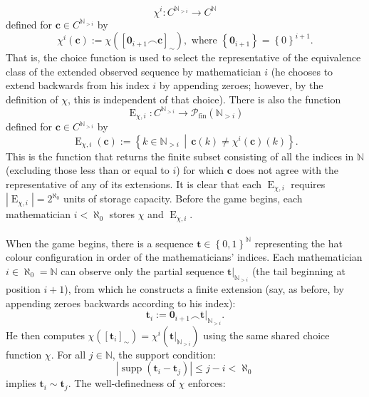 \documentclass[11pt, a4paper, oneside]{article}
\theoremstyle{remark}
\theoremstyle{lemma}
\begin{document}
\[
\chi^{i} \colon C^{\mathbb{N}_{>i}} \rightarrow C^{\mathbb{N}}
\]
defined for \( \mathbf{c} \in C^{\mathbb{N}_{>i}} \) by
\[
\chi^{i} \left( \mathbf{c} \right) := \chi \left( \left[ \mathbf{0}_{i+1} \frown \mathbf{c} \right]_{\sim} \right), \text{ where } \left\{\mathbf{0}_{i+1}\right\} = \left\{0\right\}^{i+1}.
\]
That is, the choice function is used to select the representative of the equivalence class of the extended observed sequence by mathematician \( i \) (he chooses to extend backwards from his index \( i \) by appending zeroes; however, by the definition of \( \chi \), this is independent of that choice). There is also the function
\[
\operatorname{E}_{\chi, i} \colon C^{\mathbb{N}_{>i}} \rightarrow \mathscr{P}_{\mathrm{fin}} \left( \mathbb{N}_{>i} \right)
\]
defined for \( \mathbf{c} \in C^{\mathbb{N}_{>i}} \) by
\[
\operatorname{E}_{\chi, i} \left( \mathbf{c} \right) := \left\{ k \in \mathbb{N}_{>i} \,\middle|\, \mathbf{c}(k) \neq \chi^{i} \left( \mathbf{c} \right)(k) \right\}.
\]
This is the function that returns the finite subset consisting of all the indices in \( \mathbb{N} \) (excluding those less than or equal to \( i \)) for which \( \mathbf{c} \) does not agree with the representative of any of its extensions. It is clear that each \( \operatorname{E}_{\chi, i} \) requires \(\left| \operatorname{E}_{\chi, i} \right| = 2^{\aleph_0}\) units of storage capacity. Before the game begins, each mathematician \( i < \aleph_0 \) stores \( \chi \) and \( \operatorname{E}_{\chi, i} \).
\\\\
When the game begins, there is a sequence \(\mathbf{t} \in \left\{0,1\right\}^{\mathbb{N}}\) representing the hat colour configuration in order of the mathematicians’ indices. Each mathematician \( i \in \aleph_0 = \mathbb{N} \) can observe only the partial sequence \(\left.\mathbf{t}\right|_{\mathbb{N}_{>i}}\) (the tail beginning at position \( i+1 \)), from which he constructs a finite extension (say, as before, by appending zeroes backwards according to his index):
\[
\mathbf{t}_i := \mathbf{0}_{i+1} \frown \left.\mathbf{t}\right|_{\mathbb{N}_{>i}}.
\]
He then computes \(\chi\left(\left[\mathbf{t}_i\right]_{\sim}\right) = \chi^{i} \left( \left.\mathbf{t} \right|_{\mathbb{N}_{>i}} \right)\) using the same shared choice function \(\chi\). For all \( j \in \mathbb{N} \), the support condition:
\[
\left|\operatorname{supp} \left( \mathbf{t}_i - \mathbf{t}_j \right)\right| \leq j - i < \aleph_0
\]
implies \(\mathbf{t}_i \sim \mathbf{t}_j\). The well-definedness of \(\chi\) enforces:
\end{document}
